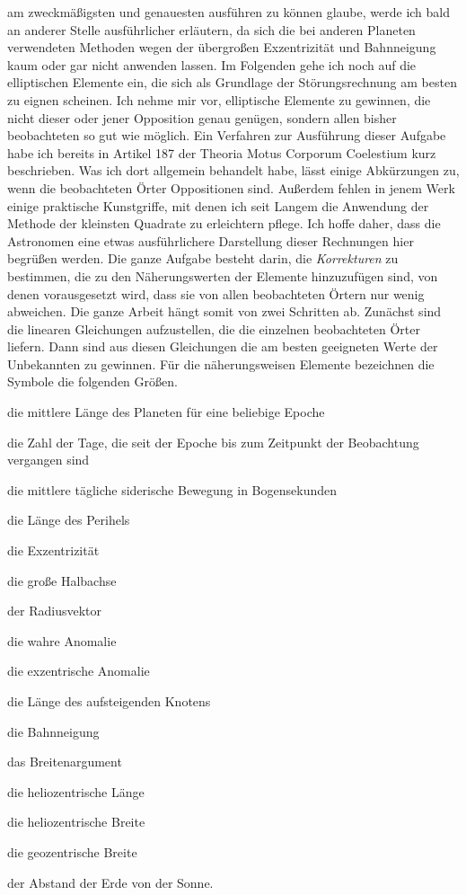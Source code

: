 am zweckmäßigsten und genauesten ausführen zu können glaube, werde ich bald an anderer Stelle ausführlicher erläutern, da sich die bei anderen Planeten verwendeten Methoden wegen der übergroßen Exzentrizität und Bahnneigung kaum oder gar nicht anwenden lassen. Im Folgenden gehe ich noch auf die elliptischen Elemente ein, die sich als Grundlage der Störungsrechnung am besten zu eignen scheinen. Ich nehme mir vor, elliptische Elemente zu gewinnen, die nicht dieser oder jener Opposition genau genügen, sondern allen bisher beobachteten so gut wie möglich. Ein Verfahren zur Ausführung dieser Aufgabe habe ich bereits in Artikel 187 der Theoria Motus Corporum Coelestium kurz beschrieben. Was ich dort allgemein behandelt habe, lässt einige Abkürzungen zu, wenn die beobachteten Örter Oppositionen sind. Außerdem fehlen in jenem Werk einige praktische Kunstgriffe, mit denen ich seit Langem die Anwendung der Methode der kleinsten Quadrate zu erleichtern pflege. Ich hoffe daher, dass die Astronomen eine etwas ausführlichere Darstellung dieser Rechnungen hier begrüßen werden. Die ganze Aufgabe besteht darin, die \textit{Korrekturen} zu bestimmen, die zu den Näherungswerten der Elemente hinzuzufügen sind, von denen vorausgesetzt wird, dass sie von allen beobachteten Örtern nur wenig abweichen. Die ganze Arbeit hängt somit von zwei Schritten ab. Zunächst sind die linearen Gleichungen aufzustellen, die die einzelnen beobachteten Örter liefern. Dann sind aus diesen Gleichungen die am besten geeigneten Werte der Unbekannten zu gewinnen.
Für die näherungsweisen Elemente bezeichnen die Symbole die folgenden Größen.
\begin{description}\setlength{\itemsep}{0pt}\setlength{\parsep}{0pt}
\item[$L$] die mittlere Länge des Planeten für eine beliebige Epoche
\item[$t$] die Zahl der Tage, die seit der Epoche bis zum Zeitpunkt der Beobachtung vergangen sind
\item[$\MeanMotionGlyph$] die mittlere tägliche siderische Bewegung in Bogensekunden
\item[$\Pi$] die Länge des Perihels
\item[$e=\sin\varphi$] die Exzentrizität
\item[$a$] die große Halbachse
\item[$r$] der Radiusvektor
\item[$v$] die wahre Anomalie
\item[$E$] die exzentrische Anomalie
\item[$\AscendingNode$] die Länge des aufsteigenden Knotens
\item[$i$] die Bahnneigung
\item[$u$] das Breitenargument
\item[$\lambda$] die heliozentrische Länge
\item[$\gamma$] die heliozentrische Breite
\item[$\ApproxBeta$] die geozentrische Breite
\item[$R$] der Abstand der Erde von der Sonne.
\end{description}

